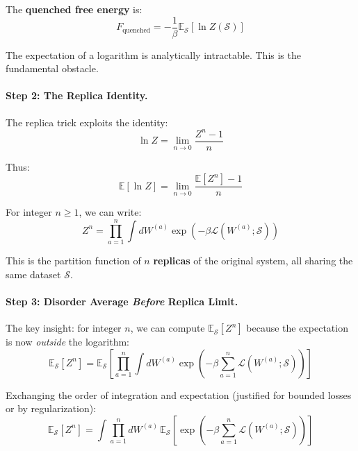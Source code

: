 \documentclass[
  journal=largetwo,
  year=2025,
  volume=37,
]{cup-journal}
\begin{document}
The \textbf{quenched free energy} is:
\begin{equation}
    F_{\text{quenched}} = -\frac{1}{\beta} \mathbb{E}_{\mathcal{S}} \left[ \ln Z(\mathcal{S}) \right]
\end{equation}

The expectation of a logarithm is analytically intractable. This is the fundamental obstacle.

\paragraph{Step 2: The Replica Identity.}

The replica trick exploits the identity:
\begin{equation}
    \ln Z = \lim_{n \to 0} \frac{Z^n - 1}{n}
\end{equation}

Thus:
\begin{equation}\label{eq:replica_average}
    \mathbb{E}[\ln Z] = \lim_{n \to 0} \frac{\mathbb{E}[Z^n] - 1}{n}
\end{equation}

For integer $n \geq 1$, we can write:
\begin{equation}
    Z^n = \prod_{a=1}^{n} \int dW^{(a)} \exp\left( -\beta \mathcal{L}(W^{(a)}; \mathcal{S}) \right)
\end{equation}

This is the partition function of $n$ \textbf{replicas} of the original system, all sharing the same dataset $\mathcal{S}$.

\paragraph{Step 3: Disorder Average \textit{Before} Replica Limit.}

The key insight: for integer $n$, we can compute $\mathbb{E}_{\mathcal{S}}[Z^n]$ because the expectation is now \textit{outside} the logarithm:
\begin{equation}
    \mathbb{E}_{\mathcal{S}}[Z^n] = \mathbb{E}_{\mathcal{S}} \left[ \prod_{a=1}^{n} \int dW^{(a)} \exp\left( -\beta \sum_{a=1}^{n} \mathcal{L}(W^{(a)}; \mathcal{S}) \right) \right]
\end{equation}

Exchanging the order of integration and expectation (justified for bounded losses or by regularization):
\begin{equation}
    \mathbb{E}_{\mathcal{S}}[Z^n] = \int \prod_{a=1}^{n} dW^{(a)} \, \mathbb{E}_{\mathcal{S}} \left[ \exp\left( -\beta \sum_{a=1}^{n} \mathcal{L}(W^{(a)}; \mathcal{S}) \right) \right]
\end{equation}
\end{document}
